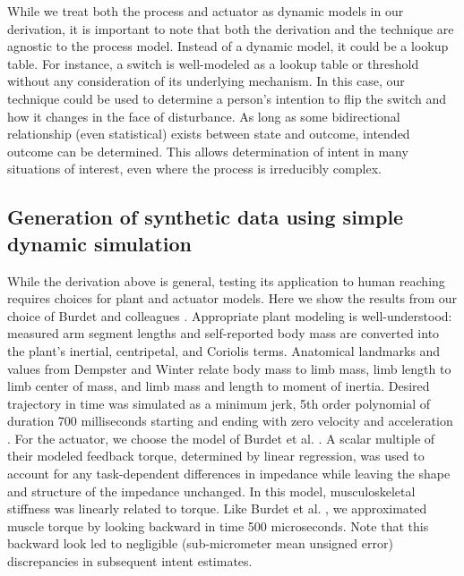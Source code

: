 \documentclass[10pt]{article}
\begin{document}
While we treat both the process and actuator as dynamic models in our derivation, it is important to note that both the derivation and the technique are agnostic to the process model. Instead of a dynamic model, it could be a lookup table. For instance, a switch is well-modeled as a lookup table or threshold without any consideration of its underlying mechanism. In this case, our technique could be used to determine a person's intention to flip the switch and how it changes in the face of disturbance. As long as some bidirectional relationship (even statistical) exists between state and outcome, intended outcome can be determined. This allows determination of intent in many situations of interest, even where the process is irreducibly complex.

\subsection*{Generation of synthetic data using simple dynamic simulation}
While the derivation above is general, testing its application to human reaching requires choices for plant and actuator models. Here we show the results from our choice of Burdet and colleagues \cite{burdet2006stability}. Appropriate plant modeling is well-understood: measured arm segment lengths and self-reported body mass are converted into the plant's inertial, centripetal, and Coriolis terms. Anatomical landmarks and values from Dempster \cite{dempster1955space} and Winter \cite{winter2009biomechanics} relate body mass to limb mass, limb length to limb center of mass, and limb mass and length to moment of inertia. Desired trajectory in time was simulated as a minimum jerk, 5th order polynomial of duration 700 milliseconds starting and ending with zero velocity and acceleration \cite{flash1985coordination}. For the actuator, we choose the model of Burdet et al. \cite{burdet2006stability}. A scalar multiple of their modeled feedback torque, determined by linear regression, was used to account for any task-dependent differences in impedance \cite{franklin2003adaptation} while leaving the shape and structure of the impedance unchanged. In this  model, musculoskeletal stiffness was linearly related to torque. Like Burdet et al. \cite{burdet2006stability}, we approximated muscle torque by looking backward in time 500 microseconds. Note that this backward look led to negligible (sub-micrometer mean unsigned error) discrepancies in subsequent intent estimates. 
\end{document}
